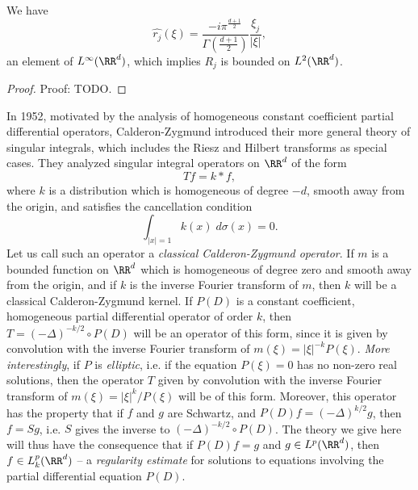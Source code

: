 \begin{lemma}
    We have
    \[ \widehat{r_j}(\xi) = \frac{-i \pi^{\frac{d+1}{2}}}{\Gamma \left( \frac{d+1}{2} \right)} \frac{\xi_j}{|\xi|}, \]
    an element of $L^\infty(\RR^d)$, which implies $R_j$ is bounded on $L^2(\RR^d)$.
\end{lemma}
\begin{proof}
    Proof: TODO.
\end{proof}

In 1952, motivated by the analysis of homogeneous constant coefficient partial differential operators, Calderon-Zygmund introduced their more general theory of singular integrals, which includes the Riesz and Hilbert transforms as special cases. They analyzed singular integral operators on $\RR^d$ of the form
%
\[ Tf = k * f, \]
%
where $k$ is a distribution which is homogeneous of degree $-d$, smooth away from the origin, and satisfies the cancellation condition
%
\[ \int_{|x| = 1} k(x)\; d\sigma(x) = 0. \]
%
Let us call such an operator a \emph{classical Calderon-Zygmund operator}. If $m$ is a bounded function on $\RR^d$ which is homogeneous of degree zero and smooth away from the origin, and if $k$ is the inverse Fourier transform of $m$, then $k$ will be a classical Calderon-Zygmund kernel. If $P(D)$ is a constant coefficient, homogeneous partial differential operator of order $k$, then $T = (-\Delta)^{-k/2} \circ P(D)$ will be an operator of this form, since it is given by convolution with the inverse Fourier transform of $m(\xi) = |\xi|^{-k} P(\xi)$. \emph{More interestingly}, if $P$ is \emph{elliptic}, i.e. if the equation $P(\xi) = 0$ has no non-zero real solutions, then the operator $T$ given by convolution with the inverse Fourier transform of $m(\xi) = |\xi|^k / P(\xi)$ will be of this form. Moreover, this operator has the property that if $f$ and $g$ are Schwartz, and $P(D) f = (-\Delta)^{k/2} g$, then $f = S g$, i.e. $S$ gives the inverse to $(-\Delta)^{-k/2} \circ P(D)$. The theory we give here will thus have the consequence that if $P(D) f = g$ and $g \in L^p(\RR^d)$, then $f \in L^p_k(\RR^d)$ -- a \emph{regularity estimate} for solutions to equations involving the partial differential equation $P(D)$.

